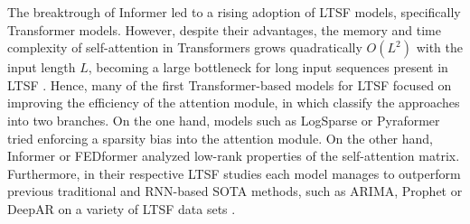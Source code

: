\documentclass[a4paper,oneside,bibliography=totoc]{scrbook}
\begin{document}
\noindent
The breaktrough of Informer led to a rising adoption of LTSF models, specifically Transformer models. However, despite their advantages, the memory and time complexity of self-attention in Transformers grows quadratically $O(L^2)$ with the input length $L$, becoming a large bottleneck for long input sequences present in LTSF \cite{zhou_informer_2021}. 
Hence, many of the first Transformer-based models for LTSF focused on improving the efficiency of the attention module, in which \citet{wen_transformers_2023} classify the approaches into two branches.
On the one hand, models such as LogSparse \cite{li_enhancing_2019} or Pyraformer \cite{liu_pyraformer_2021} tried enforcing a sparsity bias into the attention module.
On the other hand, Informer \cite{zhou_informer_2021} or FEDformer \cite{zhou_fedformer_2022} analyzed low-rank properties of the self-attention matrix.
Furthermore, in their respective LTSF studies each model manages to outperform previous traditional and RNN-based SOTA methods, such as ARIMA, Prophet or DeepAR on a variety of LTSF data sets \cite{zhou_informer_2021, wu_autoformer_2021, liu_pyraformer_2021, li_enhancing_2019, zhou_fedformer_2022}. 
\end{document}
